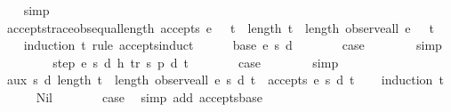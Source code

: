 \begin{isabellebody}
%
\isadelimproof
\ \ %
\endisadelimproof
%
\isatagproof
{}\isamarkupfalse%
\ simp%
\endisatagproof
{\isafoldproof}%
%
\isadelimproof
\isanewline
%
\endisadelimproof
\isanewline
{}\isamarkupfalse%
\ accepts{\isacharunderscore}trace{\isacharunderscore}obs{\isacharunderscore}equal{\isacharunderscore}length{\isacharcolon}\ {\isachardoublequoteopen}accepts\ e\ {}\ {\isacharless}{\isachargreater}\ t\ {\isasymLongrightarrow}\ {\isacharparenleft}length\ t\ {\isacharequal}\ length\ {\isacharparenleft}observe{\isacharunderscore}all\ e\ {}\ {\isacharless}{\isachargreater}\ t{\isacharparenright}{\isacharparenright}{\isachardoublequoteclose}\isanewline
%
\isadelimproof
\ \ %
\endisadelimproof
%
\isatagproof
{}\isamarkupfalse%
\ {\isacharparenleft}induction\ t\ rule{\isacharcolon}\ accepts{\isachardot}induct{\isacharparenright}\isanewline
\ \ \ \ \isamarkupfalse%
\ {\isacharparenleft}base\ e\ s\ d{\isacharparenright}\isanewline
\ \ \ \ \isamarkupfalse%
\ \isamarkupfalse%
\ {\isacharquery}case\isanewline
\ \ \ \ \ \ \isamarkupfalse%
\ simp\isanewline
\ \ \isamarkupfalse%
\isanewline
\ \ \ \ \isamarkupfalse%
\ {\isacharparenleft}step\ e\ s\ d\ h\ tr\ s{\isacharprime}\ p{\isacharprime}\ d{\isacharprime}\ t{\isacharparenright}\isanewline
\ \ \ \ \isamarkupfalse%
\ \isamarkupfalse%
\ {\isacharquery}case\isanewline
\ \ \ \ \ \ \isamarkupfalse%
\ simp\isanewline
\ \ \isamarkupfalse%
%
\endisatagproof
{\isafoldproof}%
%
\isadelimproof
\isanewline
%
\endisadelimproof
\isanewline
{}\isamarkupfalse%
\ aux{}{\isacharcolon}\ {\isachardoublequoteopen}{\isasymforall}s\ d{\isachardot}\ {\isacharparenleft}length\ t\ {\isacharequal}\ length\ {\isacharparenleft}observe{\isacharunderscore}all\ e\ s\ d\ t{\isacharparenright}{\isacharparenright}\ {\isasymlongrightarrow}\ accepts\ e\ s\ d\ t{\isachardoublequoteclose}\isanewline
%
\isadelimproof
\ \ %
\endisadelimproof
%
\isatagproof
{}\isamarkupfalse%
\ {\isacharparenleft}induction\ t{\isacharparenright}\isanewline
\ \ \ \ \isamarkupfalse%
\ Nil\isanewline
\ \ \ \ \isamarkupfalse%
\ \isamarkupfalse%
\ {\isacharquery}case\ \isamarkupfalse%
\ {\isacharparenleft}simp\ add{\isacharcolon}\ accepts{\isachardot}base{\isacharparenright}\isanewline
\ \ \isamarkupfalse%
\isanewline
\ \ \ \ \isamarkupfalse%

\end{isabellebody}
